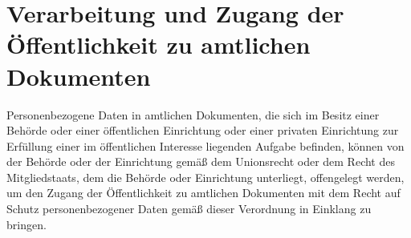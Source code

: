 \chapter{Verarbeitung und Zugang der Öffentlichkeit zu amtlichen Dokumenten}
\label{ch:86}


Personenbezogene Daten in amtlichen Dokumenten, die sich im Besitz einer Behörde oder einer öffentlichen Einrichtung
oder einer privaten Einrichtung zur Erfüllung einer im öffentlichen Interesse liegenden Aufgabe befinden, können von
der Behörde oder der Einrichtung gemäß dem Unionsrecht oder dem Recht des Mitgliedstaats, dem die Behörde oder
Einrichtung unterliegt, offengelegt werden, um den Zugang der Öffentlichkeit zu amtlichen Dokumenten mit dem Recht auf
Schutz personenbezogener Daten gemäß dieser Verordnung in Einklang zu bringen.


